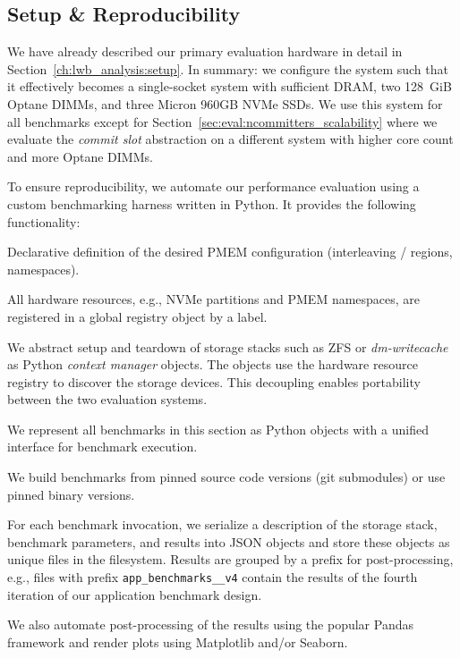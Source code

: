 \documentclass[12pt,a4paper,twoside]{book}
\begin{document}
\subsection{Setup \& Reproducibility}
We have already described our primary evaluation hardware in detail in Section~\ref{ch:lwb_analysis:setup}.
In summary: we configure the system such that it effectively becomes a single-socket system with sufficient DRAM, two 128~GiB Optane DIMMs, and three Micron 960GB NVMe SSDs.
We use this system for all benchmarks except for Section~\ref{sec:eval:ncommitters_scalability} where we evaluate the \textit{commit slot} abstraction on a different system with higher core count and more Optane DIMMs.

To ensure reproducibility, we automate our performance evaluation using a custom benchmarking harness written in Python.
It provides the following functionality:
\begin{description}[noitemsep]
    \item[Declarative PMEM Provisioning] Declarative definition of the desired PMEM configuration (interleaving / regions, namespaces).
    \item[Hardware Resource Registry]  All hardware resources, e.g., NVMe partitions and PMEM namespaces, are registered in a global registry object by a label.
    \item[Unified Storage Software Configuration] We abstract setup and teardown of storage stacks such as ZFS or \textit{dm-writecache} as Python \textit{context manager} objects.
        The objects use the hardware resource registry to discover the storage devices.
        This decoupling enables portability between the two evaluation systems.
    \item[Unified Benchmark Abstraction] We represent all benchmarks in this section as Python objects with a unified interface for benchmark execution.
    \item[Pinned Software Versions] We build benchmarks from pinned source code versions (git submodules) or use pinned binary versions.
    \item[Result Storage] For each benchmark invocation, we serialize a description of the storage stack, benchmark parameters, and results into JSON objects and store these objects as unique files in the filesystem.
        Results are grouped by a prefix for post-processing, e.g., files with prefix \lstinline{app_benchmarks__v4} contain the results of the fourth iteration of our application benchmark design.
\end{description}
We also automate post-processing of the results using the popular Pandas framework and render plots using Matplotlib and/or Seaborn.
\end{document}
